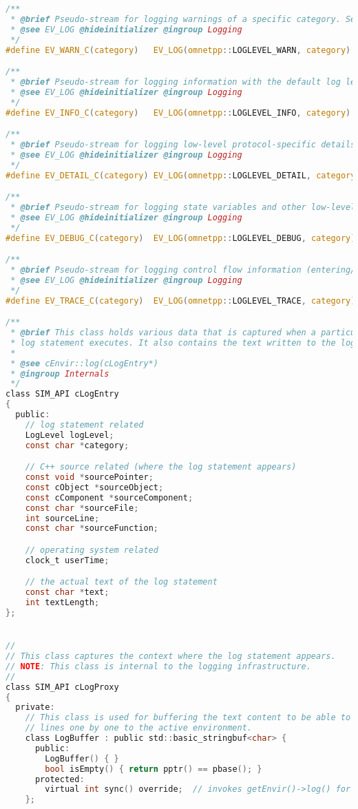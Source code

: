 \begin{lstlisting}[language=c]
/**
 * @brief Pseudo-stream for logging warnings of a specific category. See EV_LOG for details.
 * @see EV_LOG @hideinitializer @ingroup Logging
 */
#define EV_WARN_C(category)   EV_LOG(omnetpp::LOGLEVEL_WARN, category)

/**
 * @brief Pseudo-stream for logging information with the default log level of a specific category. See EV_LOG for details.
 * @see EV_LOG @hideinitializer @ingroup Logging
 */
#define EV_INFO_C(category)   EV_LOG(omnetpp::LOGLEVEL_INFO, category)

/**
 * @brief Pseudo-stream for logging low-level protocol-specific details of a specific category. See EV_LOG for details.
 * @see EV_LOG @hideinitializer @ingroup Logging
 */
#define EV_DETAIL_C(category) EV_LOG(omnetpp::LOGLEVEL_DETAIL, category)

/**
 * @brief Pseudo-stream for logging state variables and other low-level information of a specific category. See EV_LOG for details.
 * @see EV_LOG @hideinitializer @ingroup Logging
 */
#define EV_DEBUG_C(category)  EV_LOG(omnetpp::LOGLEVEL_DEBUG, category)

/**
 * @brief Pseudo-stream for logging control flow information (entering/exiting functions, etc) of a specific category. See EV_LOG for details.
 * @see EV_LOG @hideinitializer @ingroup Logging
 */
#define EV_TRACE_C(category)  EV_LOG(omnetpp::LOGLEVEL_TRACE, category)

/**
 * @brief This class holds various data that is captured when a particular
 * log statement executes. It also contains the text written to the log stream.
 *
 * @see cEnvir::log(cLogEntry*)
 * @ingroup Internals
 */
class SIM_API cLogEntry
{
  public:
    // log statement related
    LogLevel logLevel;
    const char *category;

    // C++ source related (where the log statement appears)
    const void *sourcePointer;
    const cObject *sourceObject;
    const cComponent *sourceComponent;
    const char *sourceFile;
    int sourceLine;
    const char *sourceFunction;

    // operating system related
    clock_t userTime;

    // the actual text of the log statement
    const char *text;
    int textLength;
};


//
// This class captures the context where the log statement appears.
// NOTE: This class is internal to the logging infrastructure.
//
class SIM_API cLogProxy
{
  private:
    // This class is used for buffering the text content to be able to send whole
    // lines one by one to the active environment.
    class LogBuffer : public std::basic_stringbuf<char> {
      public:
        LogBuffer() { }
        bool isEmpty() { return pptr() == pbase(); }
      protected:
        virtual int sync() override;  // invokes getEnvir()->log() for each log line
    };


\end{lstlisting}
